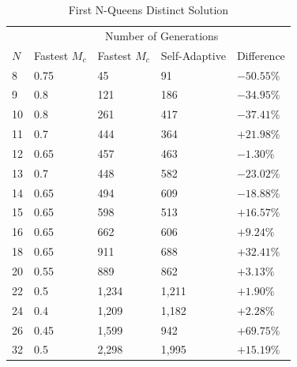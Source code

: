 \documentclass[conference]{IEEEtran}
\begin{document}
\begin{table}
\centering
\caption{First N-Queens Distinct Solution}
\begin{tabular}{|l|l|l|l|l|} \hline
&               &  \multicolumn{2}{c|}{Number of Generations}& \\ \cline{3-4}
$N$&    Fastest $M_{c}$&    Fastest $M_{c}$&   Self-Adaptive&    Difference\\ \hline
 8&     0.75&               45&                     91&                     $ -50.55\% $\\ \hline
 9&     0.8&                121&                    186&                    $ -34.95\% $\\ \hline
10&     0.8&                261&                    417&                    $ -37.41\% $\\ \hline
11&     0.7&                444&                    364&                    $ +21.98\% $\\ \hline
12&     0.65&               457&                    463&                    $ -1.30\%  $\\ \hline
13&     0.7&                448&                    582&                    $ -23.02\% $\\ \hline
14&     0.65&               494&                    609&                    $ -18.88\% $\\ \hline
15&     0.65&               598&                    513&                    $ +16.57\% $\\ \hline
16&     0.65&               662&                    606&                    $ +9.24\%  $\\ \hline
18&     0.65&               911&                    688&                    $ +32.41\% $\\ \hline
20&     0.55&               889&                    862&                    $ +3.13\%  $\\ \hline
22&     0.5&                1,234&                  1,211&                  $ +1.90\%  $\\ \hline
24&     0.4&                1,209&                  1,182&                  $ +2.28\%  $\\ \hline
26&     0.45&               1,599&                  942&                    $ +69.75\% $\\ \hline
32&     0.5&                2,298&                  1,995&                  $ +15.19\% $\\ \hline
\end{tabular}
\label{table:firstsol}
\end{table}
\end{document}
